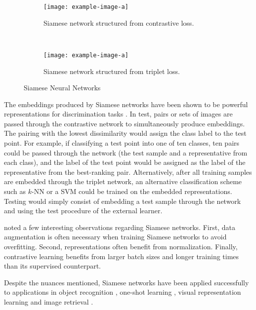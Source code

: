 		
		\begin{figure*}[h!]
			\hfill
			\begin{subfigure}[t]{0.5\textwidth}
				\texttt{[image: example-image-a]}
				\caption{Siamese network structured from contrastive loss.}
				\label{fig:siamese_networks_conrastive}
			\end{subfigure}%
			\centering
			~ 
			\begin{subfigure}[t]{0.5\textwidth}
				\centering
				\texttt{[image: example-image-a]}
				\caption{Siamese network structured from triplet loss.}
				\label{fig:siamese_networks_triplet}
			\end{subfigure}
		
			\caption[Siamese Neural Networks]{Siamese Neural Networks }
			\label{fig:siamese_networks}%
		\end{figure*}
	
	
		The embeddings produced by Siamese networks have  been shown to be powerful representations for discrimination tasks \citep{Chen2020ContrastiveLearning, Schroff2015FaceNet, Koch2015SiameseNetworks}.  In test, pairs or sets of images are passed through the contrastive network to simultaneously produce embeddings.  The pairing with the lowest dissimilarity would assign the class label to the test point.  For example, if classifying a test point into one of ten classes, ten pairs could be passed through the network (the test sample and a representative from each class), and the label of the test point would be assigned as the label of the representative from the best-ranking pair.   Alternatively, after all training samples are embedded through the triplet network, an alternative classification scheme such as $k$-NN or a SVM could be trained on the embedded representations.  Testing would simply consist of embedding a test sample through the network and using the test procedure of the external learner.
		
		
		\cite{Chen2020ContrastiveLearning} noted a few interesting observations regarding Siamese networks. First, data augmentation is often necessary when training Siamese networks to avoid overfitting.  Second, representations often benefit from normalization. Finally, contrastive learning benefits from larger batch sizes and longer training times than its supervised counterpart.
		
		Despite the nuances mentioned, Siamese networks have been applied  successfully to applications in object recognition \citep{Hoffer2015DeepMetricLearning}, one-shot learning \citep{Koch2015SiameseNetworks}, visual representation learning \citep{Chen2020ContrastiveLearning} and image retrieval \citep{Hoffer2015DeepMetricLearning}.
		
